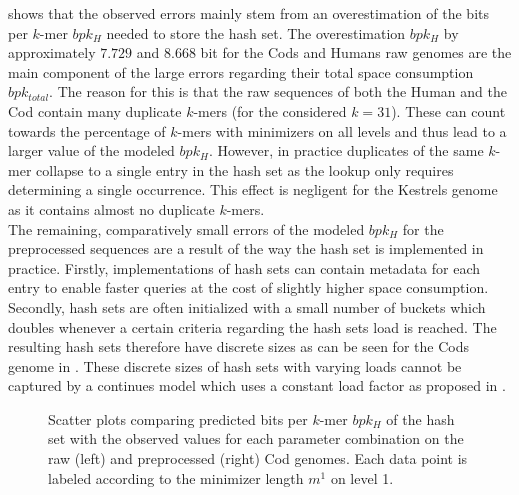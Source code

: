 \documentclass[a4paper,titlepage,onecolumn,oneside,12pt,nenglish,titlepage=firstiscover]{scrbook}
\theoremstyle{plain} %
\theoremstyle{definition} %
\theoremstyle{remark} %
\theoremstyle{plain}
\newcommand{\minimizerLength}{m}
\begin{document}
\begin{table}[h]
	\centering
	
	\caption{Statistic evaluation for the variables modeling the total bits per $k$-mer $bpk_T$ for the text and $bpk_H$ for the hash set. The tables show the predicted values $Pred$ compared against the observed ones $Obs$. All values have been rounded to four significant figures. The correlation coefficient for the predicted and observed values of $bpk_T$ is not defined as the variance $\sigma_{Pred}$ of its predicted value $bpk_T = 2$ is zero.} 
	\label{tab:bpk_T_H_Overview}
\end{table}
 shows that the observed errors mainly stem from an overestimation of the bits per $k$-mer $bpk_H$ needed to store the hash set. The overestimation $bpk_H$ by approximately $7.729$ and $8.668$ bit for the Cods and Humans raw genomes are the main component of the large errors regarding their total space consumption $bpk_{total}$. The reason for this is that the raw sequences of both the Human and the Cod contain many duplicate $k$-mers (for the considered $k=31$). These can count towards the percentage of $k$-mers with \infrequent minimizers on all levels and thus lead to a larger value of the modeled $bpk_H$. However, in practice duplicates of the same $k$-mer collapse to a single entry in the hash set as the lookup only requires determining a single occurrence. This effect is negligent for the Kestrels genome as it contains almost no duplicate $k$-mers.
\\
The remaining, comparatively small errors of the modeled $bpk_H$ for the preprocessed sequences are a result of the way the hash set is implemented in practice. Firstly, implementations of hash sets can contain metadata for each entry to enable faster queries at the cost of slightly higher space consumption. Secondly, hash sets are often initialized with a small number of buckets which doubles whenever a certain criteria regarding the hash sets load is reached. The resulting hash sets therefore have discrete sizes as can be seen for the Cods genome in . These discrete sizes of hash sets with varying loads cannot be captured by a continues model which uses a constant load factor as proposed in .\\
\begin{figure}[h]
	\centering
	
	\caption{Scatter plots comparing predicted bits per $k$-mer $bpk_H$ of the hash set with the observed values for each parameter combination on the raw (left) and preprocessed (right) Cod genomes. Each data point is labeled according to the minimizer length $\minimizerLength^1$ on level 1.} \label{fig:bpkHCodSctterPlot}
\end{figure}
\end{document}
